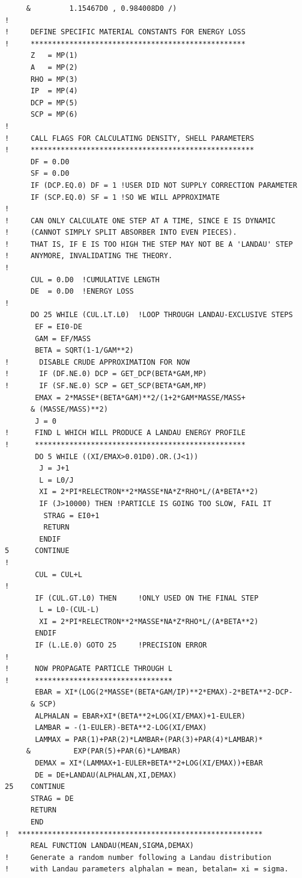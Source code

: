 \begin{lstlisting}
     &         1.15467D0 , 0.984008D0 /)
!
!     DEFINE SPECIFIC MATERIAL CONSTANTS FOR ENERGY LOSS
!     **************************************************
      Z   = MP(1)
      A   = MP(2)
      RHO = MP(3)
      IP  = MP(4)
      DCP = MP(5)
      SCP = MP(6)
!
!     CALL FLAGS FOR CALCULATING DENSITY, SHELL PARAMETERS
!     ****************************************************
      DF = 0.D0
      SF = 0.D0
      IF (DCP.EQ.0) DF = 1 !USER DID NOT SUPPLY CORRECTION PARAMETER
      IF (SCP.EQ.0) SF = 1 !SO WE WILL APPROXIMATE
!      
!     CAN ONLY CALCULATE ONE STEP AT A TIME, SINCE E IS DYNAMIC
!     (CANNOT SIMPLY SPLIT ABSORBER INTO EVEN PIECES).
!     THAT IS, IF E IS TOO HIGH THE STEP MAY NOT BE A 'LANDAU' STEP
!     ANYMORE, INVALIDATING THE THEORY.
!
      CUL = 0.D0  !CUMULATIVE LENGTH
      DE  = 0.D0  !ENERGY LOSS
!
      DO 25 WHILE (CUL.LT.L0)  !LOOP THROUGH LANDAU-EXCLUSIVE STEPS
       EF = EI0-DE
       GAM = EF/MASS
       BETA = SQRT(1-1/GAM**2)
!       DISABLE CRUDE APPROXIMATION FOR NOW
!       IF (DF.NE.0) DCP = GET_DCP(BETA*GAM,MP)
!       IF (SF.NE.0) SCP = GET_SCP(BETA*GAM,MP)
       EMAX = 2*MASSE*(BETA*GAM)**2/(1+2*GAM*MASSE/MASS+
      & (MASSE/MASS)**2)
       J = 0
!      FIND L WHICH WILL PRODUCE A LANDAU ENERGY PROFILE
!      *************************************************
       DO 5 WHILE ((XI/EMAX>0.01D0).OR.(J<1))
        J = J+1
        L = L0/J
        XI = 2*PI*RELECTRON**2*MASSE*NA*Z*RHO*L/(A*BETA**2)
        IF (J>10000) THEN !PARTICLE IS GOING TOO SLOW, FAIL IT
         STRAG = EI0+1
         RETURN
        ENDIF 
5      CONTINUE      
!
       CUL = CUL+L
!
       IF (CUL.GT.L0) THEN     !ONLY USED ON THE FINAL STEP       
        L = L0-(CUL-L)
        XI = 2*PI*RELECTRON**2*MASSE*NA*Z*RHO*L/(A*BETA**2)
       ENDIF
       IF (L.LE.0) GOTO 25     !PRECISION ERROR
!
!      NOW PROPAGATE PARTICLE THROUGH L
!      ********************************
       EBAR = XI*(LOG(2*MASSE*(BETA*GAM/IP)**2*EMAX)-2*BETA**2-DCP-
      & SCP)
       ALPHALAN = EBAR+XI*(BETA**2+LOG(XI/EMAX)+1-EULER)
       LAMBAR = -(1-EULER)-BETA**2-LOG(XI/EMAX)
       LAMMAX = PAR(1)+PAR(2)*LAMBAR+(PAR(3)+PAR(4)*LAMBAR)*
     &          EXP(PAR(5)+PAR(6)*LAMBAR)
       DEMAX = XI*(LAMMAX+1-EULER+BETA**2+LOG(XI/EMAX))+EBAR       
       DE = DE+LANDAU(ALPHALAN,XI,DEMAX)
25    CONTINUE
      STRAG = DE
      RETURN
      END
!  *********************************************************
      REAL FUNCTION LANDAU(MEAN,SIGMA,DEMAX)
!     Generate a random number following a Landau distribution
!     with Landau parameters alphalan = mean, betalan= xi = sigma.

\end{lstlisting}
